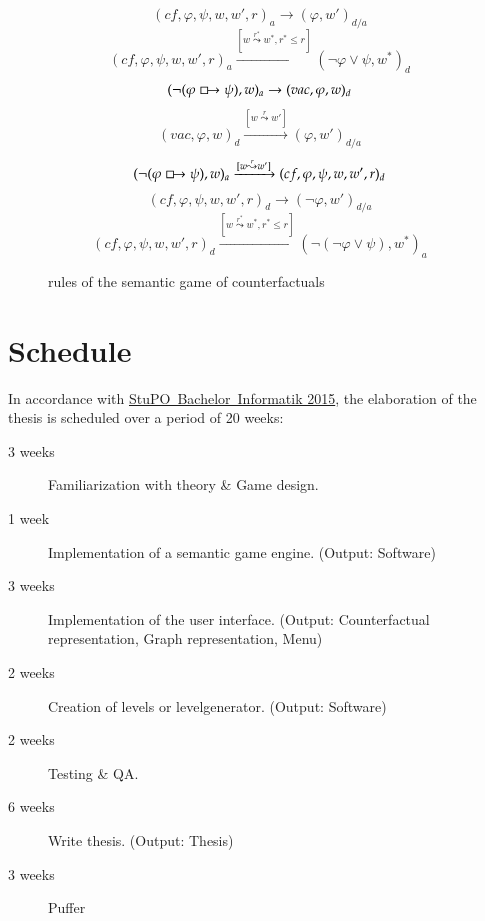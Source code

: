 \documentclass[a4paper,american]{paper}
\begin{document}
\begin{figure}[H]
	\begin{equation}
		(cf,\varphi ,\psi ,w,w',r)_a\rightarrow (\varphi ,w')_{d/a}
	\end{equation}
	\begin{equation}
		(cf,\varphi ,\psi ,w,w',r)_a\xrightarrow{[w\overset{r^*}{\leadsto}w^*,r^*\leq r]}(\neg\varphi\vee\psi ,w^*)_d
	\end{equation}
	\begin{equation}
		(\neg (\varphi\boxright\psi ),w)_a\rightarrow (vac,\varphi ,w)_d
	\end{equation}
	\begin{equation}
		(vac,\varphi ,w)_d\xrightarrow{[w\overset{r}{\leadsto}w']} (\varphi ,w')_{d/a}
	\end{equation}
	\begin{equation}
		(\neg (\varphi\boxright\psi ),w)_a\xrightarrow{[w\overset{r}{\leadsto}w']}(cf,\varphi ,\psi ,w,w',r)_d
	\end{equation}
	\begin{equation}
		(cf,\varphi ,\psi ,w,w',r)_d\rightarrow(\neg\varphi ,w')_{d/a}
	\end{equation}
	\begin{equation}
		(cf,\varphi ,\psi ,w,w',r)_d\xrightarrow{[w\overset{r^*}{\leadsto}w^*, r^*\leq r]}(\neg(\neg\varphi\vee\psi ),w^*)_a
	\end{equation}
	\caption{rules of the semantic game of counterfactuals}
	\label{fig:rules}
\end{figure}

\section*{Schedule}

In accordance with \href{https://www.eecs.tu-berlin.de/fileadmin/f4/fkIVdokumente/StuPOs/Informatik/Lesefassung_BSc_Informatik.pdf}{StuPO~Bachelor~Informatik 2015}, the elaboration of the thesis is scheduled over a period of 20 weeks:
\begin{description}
\item [3 weeks] Familiarization with theory \& Game design.
\item [1 week] Implementation of a semantic game engine. (Output: Software)
\item [3 weeks] Implementation of the user interface. (Output: Counterfactual representation, Graph representation, Menu)
\item [2 weeks] Creation of levels or levelgenerator. (Output: Software)
\item [2 weeks] Testing \& QA.
\item [6 weeks] Write thesis. (Output: Thesis)
\item [3 weeks] Puffer
\end{description}
\end{document}
